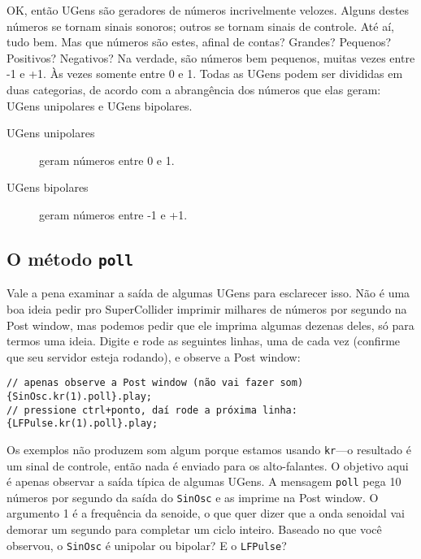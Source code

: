 OK, então UGens são geradores de números incrivelmente velozes. Alguns destes números se tornam sinais sonoros; outros se tornam sinais de controle. Até aí, tudo bem. Mas que números são estes, afinal de contas? Grandes? Pequenos? Positivos? Negativos? Na verdade, são números bem pequenos, muitas vezes entre -1 e +1. Às vezes somente entre 0 e 1. Todas as UGens podem ser divididas em duas categorias, de acordo com a abrangência dos números que elas geram: UGens unipolares e UGens bipolares.

\begin{description}
\item[UGens unipolares] geram números entre 0 e 1.
\item[UGens bipolares] geram números entre -1 e +1.

\end{description}

\subsection{O método \texttt{poll}}

Vale a pena examinar a saída de algumas UGens para esclarecer isso. Não é uma boa ideia pedir pro SuperCollider imprimir milhares de números por segundo na Post window, mas podemos pedir que ele imprima algumas dezenas deles, só para termos uma ideia. Digite e rode as seguintes linhas, uma de cada vez (confirme que seu servidor esteja rodando), e observe a Post window: 

\begin{lstlisting}[style=SuperCollider-IDE, basicstyle=\scttfamily\footnotesize]
// apenas observe a Post window (não vai fazer som)
{SinOsc.kr(1).poll}.play;
// pressione ctrl+ponto, daí rode a próxima linha:
{LFPulse.kr(1).poll}.play;
\end{lstlisting}

Os exemplos não produzem som algum porque estamos usando \texttt{kr}---o resultado é um sinal de controle, então nada é enviado para os alto-falantes. O objetivo aqui é apenas observar a saída típica de algumas UGens. A mensagem \texttt{poll} pega 10 números por segundo da saída do \texttt{SinOsc} e as imprime na Post window. O argumento 1 é a frequência da senoide, o que quer dizer que a onda senoidal vai demorar um segundo para completar um ciclo inteiro. Baseado no que você observou, o \texttt{SinOsc} é unipolar ou bipolar? E o \texttt{LFPulse}?

